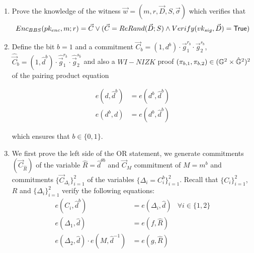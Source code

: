 \begin{description}
\begin{enumerate}
  \item Prove the knowledge of the witness $\vec{w} = (m, r, \vec{D}, S, \vec{\sigma})$ which verifies that
    \begin{align*}
      Enc_{BBS}(pk_{enc}, m; r) = \vec{C} \vee (\vec{C} = ReRand(\vec{D}; S) \wedge Verify(vk_{sig}, \vec{D}) = \mathsf{True})
    \end{align*}
    
  \item Define the bit $b = 1$ and a commitment $\vec{C}_b = (1,d^b)\cdot \vec{g}_1^{r_b} \cdot \vec{g}_2^{s_b}$, $\hat{\vec{C}}_b = (1,\hat{d}^b) \cdot \hat{\vec{g}}_1^{r_{\hat{b}}} \cdot \hat{\vec{g}}_2^{s_{\hat{b}}}$ and also a $WI-NIZK$ proof $(\pi_{b,1}, \pi_{b,2}) \in (\mathbb{G}^2 \times \hat{\mathbb{G}}^2)^2$ of the pairing product equation 
  
  \begin{align}
    e(d, \boxed{\hat{d}^b}) &= e(\boxed{d^b}, \boxed{\hat{d}^b}) \tag{1}\\
    e(\boxed{d^b}, d) &= e(\boxed{d^b}, \boxed{\hat{d}^b}) \tag{2}
  \end{align}
  
  which ensures that $b \in \{0,1\}$.

  \item We first prove the left side of the OR statement, we generate commitments $(\vec{C}_{\hat{R}})$ of the variable $\hat{R} = \hat{d}^{\theta b}$ and $\vec{C}_{M}$ commitment of $M = m^b$ and commitments $\{\vec{C}_{\Delta_i}\}_{i=1}^2$ of the variables $\{\Delta_i = C_i^b\}_{i=1}^2$. Recall that $\{C_i\}_{i=1}^2$, $R$ and $\{\Delta_i\}_{i=1}^2$ verify the following equations:
    \begin{align}
      e(C_i, \boxed{\hat{d}^b}) &= e(\boxed{\Delta_i}, \hat{d})  &\forall i \in \{1,2\} \tag{3,4}\\
      e(\boxed{\Delta_1}, \hat{d}) &= e(f, \boxed{\hat{R}}) \tag{5}\\
      e(\boxed{\Delta_2}, \hat{d}) \cdot e(\boxed{M}, \hat{d}^{-1}) &= e(g, \boxed{\hat{R}}) \tag{6}
    \end{align}




\end{enumerate}
\end{description}
